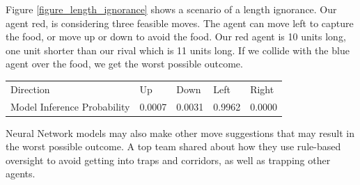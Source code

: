 Figure \ref{figure_length_ignorance} shows a scenario of a length ignorance. Our agent red, is considering three feasible moves. The agent can move left to capture the food, or move up or down to avoid the food. Our red agent is 10 units long, one unit shorter than our rival which is 11 units long. If we collide with the blue agent over the food, we get the worst possible outcome.

\begin{table}[h!]
\begin{tabular}{lllll}
Direction                   & Up     & Down   & Left   & Right  \\
Model Inference Probability & 0.0007 & 0.0031 & 0.9962 & 0.0000
\end{tabular}
\end{table}

Neural Network models may also make other move suggestions that may result in the worst possible outcome. A top team \cite{sharing_robga} shared about how they use rule-based oversight to avoid getting into traps and corridors, as well as trapping other agents.



